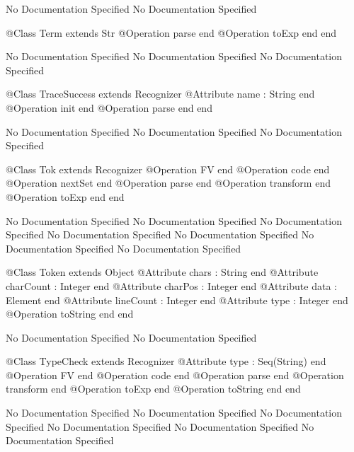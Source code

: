 No Documentation Specified
No Documentation Specified
\begin{Interface}
@Class Term extends Str
  @Operation parse end
  @Operation toExp end
end
\end{Interface}
No Documentation Specified
No Documentation Specified
No Documentation Specified
\begin{Interface}
@Class TraceSuccess extends Recognizer
  @Attribute name : String end
  @Operation init end
  @Operation parse end
end
\end{Interface}
No Documentation Specified
No Documentation Specified
No Documentation Specified
\begin{Interface}
@Class Tok extends Recognizer
  @Operation FV end
  @Operation code end
  @Operation nextSet end
  @Operation parse end
  @Operation transform end
  @Operation toExp end
end
\end{Interface}
No Documentation Specified
No Documentation Specified
No Documentation Specified
No Documentation Specified
No Documentation Specified
No Documentation Specified
No Documentation Specified
\begin{Interface}
@Class Token extends Object
  @Attribute chars : String end
  @Attribute charCount : Integer end
  @Attribute charPos : Integer end
  @Attribute data : Element end
  @Attribute lineCount : Integer end
  @Attribute type : Integer end
  @Operation toString end
end
\end{Interface}
No Documentation Specified
No Documentation Specified
\begin{Interface}
@Class TypeCheck extends Recognizer
  @Attribute type : Seq(String) end
  @Operation FV end
  @Operation code end
  @Operation parse end
  @Operation transform end
  @Operation toExp end
  @Operation toString end
end
\end{Interface}
No Documentation Specified
No Documentation Specified
No Documentation Specified
No Documentation Specified
No Documentation Specified
No Documentation Specified

